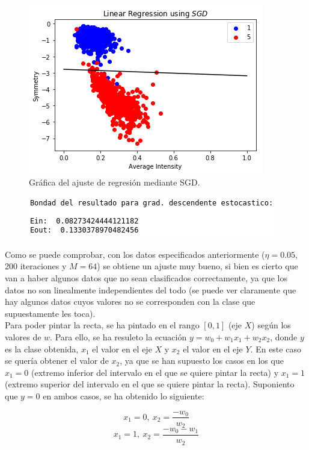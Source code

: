 \documentclass[11pt,a4paper]{article}
\begin{document}
\begin{figure}[H]
\centering
\includegraphics[scale=0.8]{img/sgd_regression.png}
\caption{Gráfica del ajuste de regresión mediante SGD.}
\end{figure}

\begin{figure}[H]
\centering
\includegraphics[scale=0.6]{img/sgd_regression_error.png}
\end{figure}

Como se puede comprobar, con los datos especificados anteriormente ($\eta = 0.05$, 200 iteraciones y $M = 64$) se obtiene
un ajuste muy bueno, si bien es cierto que van a haber algunos datos que no sean clasificados correctamente, ya que los
datos no son linealmente independientes del todo (se puede ver claramente que hay algunos datos cuyos valores no se
corresponden con la clase que supuestamente les toca).\\

Para poder pintar la recta, se ha pintado en el rango $[0, 1]$ (eje $X$) según los valores de $w$. Para ello, se ha
resuleto la ecuación $y = w_0 + w_1 x_1 + w_2 x_2$, donde $y$ es la clase obtenida, $x_1$ el valor en el eje $X$ y $x_2$ el
valor en el eje $Y$. En este caso se quería obtener el valor de $x_2$, ya que se han supuesto los casos en los que $x_1 = 0$
(extremo inferior del intervalo en el que se quiere pintar la recta) y $x_1 = 1$ (extremo superior del intervalo en el que se
quiere pintar la recta). Suponiento que $y = 0$ en ambos casos, se ha obtenido lo siguiente:

\[x_1 = 0, \: x_2 = \frac{-w_0}{w_2} \]
\[x_1 = 1, \: x_2 = \frac{-w_0 - w_1}{w_2} \]
\end{document}
